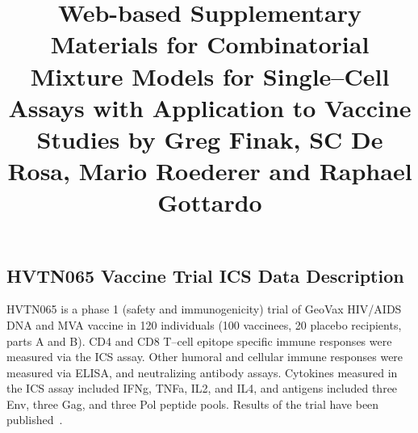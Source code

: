 \documentclass{article}
\title{Web-based Supplementary Materials for Combinatorial Mixture Models for Single--Cell Assays with Application to Vaccine Studies by Greg Finak, SC De Rosa, Mario Roederer and Raphael Gottardo}
\date{}
\begin{document}
\maketitle
\appendix
\renewcommand{\thesubsection}{Web Appendix \Alph{subsection}:}
\setcounter{subsection}{0}
\renewcommand{\figurename}{\textbf{Web Figure}}
\renewcommand{\thefigure}{\textbf{\Alph{figure}}}
\setcounter{figure}{0}

\section*{}
\subsection{HVTN065 Vaccine Trial ICS Data Description}
\label{supp:statpublished}
HVTN065 is a phase 1 (safety and immunogenicity) trial of GeoVax HIV/AIDS DNA and MVA vaccine in 120 individuals (100 vaccinees, 20 placebo recipients, parts A and B). CD4 and CD8 T--cell epitope specific immune responses were measured via the ICS assay. Other humoral and cellular immune responses were measured via ELISA, and neutralizing antibody assays. Cytokines measured in the ICS assay included IFNg, TNFa, IL2, and IL4, and antigens included three Env, three Gag, and three Pol peptide pools. Results of the trial have been published~\citep{Goonetilleke:2006jk}.

\end{document}
